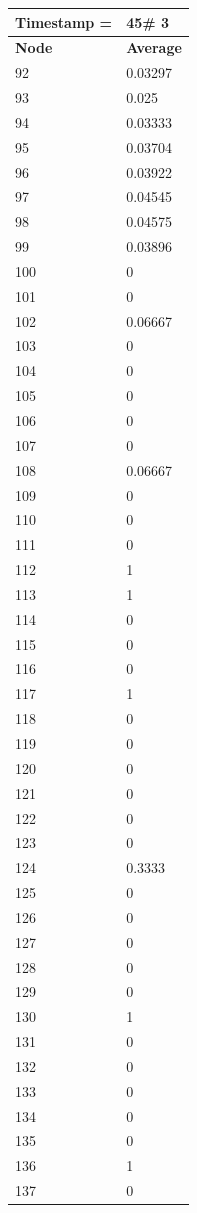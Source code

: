 \begin{tabular}{|l||l|}
\hline
\textbf{Timestamp =} & \textbf{45}\# 3\\\hline
	\textbf{Node} & \textbf{Average} \\ \hline
\hline
	92 & 0.03297 \\ \hline
	93 & 0.025 \\ \hline
	94 & 0.03333 \\ \hline
	95 & 0.03704 \\ \hline
	96 & 0.03922 \\ \hline
	97 & 0.04545 \\ \hline
	98 & 0.04575 \\ \hline
	99 & 0.03896 \\ \hline
	100 & 0 \\ \hline
	101 & 0 \\ \hline
	102 & 0.06667 \\ \hline
	103 & 0 \\ \hline
	104 & 0 \\ \hline
	105 & 0 \\ \hline
	106 & 0 \\ \hline
	107 & 0 \\ \hline
	108 & 0.06667 \\ \hline
	109 & 0 \\ \hline
	110 & 0 \\ \hline
	111 & 0 \\ \hline
	112 & 1 \\ \hline
	113 & 1 \\ \hline
	114 & 0 \\ \hline
	115 & 0 \\ \hline
	116 & 0 \\ \hline
	117 & 1 \\ \hline
	118 & 0 \\ \hline
	119 & 0 \\ \hline
	120 & 0 \\ \hline
	121 & 0 \\ \hline
	122 & 0 \\ \hline
	123 & 0 \\ \hline
	124 & 0.3333 \\ \hline
	125 & 0 \\ \hline
	126 & 0 \\ \hline
	127 & 0 \\ \hline
	128 & 0 \\ \hline
	129 & 0 \\ \hline
	130 & 1 \\ \hline
	131 & 0 \\ \hline
	132 & 0 \\ \hline
	133 & 0 \\ \hline
	134 & 0 \\ \hline
	135 & 0 \\ \hline
	136 & 1 \\ \hline
	137 & 0 \\ \hline
\end{tabular}

